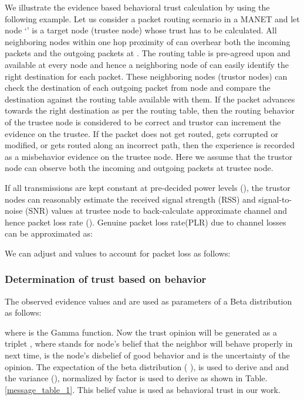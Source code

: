 \documentclass[conference]{IEEEtran}
\begin{document}
We illustrate the evidence based behavioral trust calculation by using the following example.
Let us consider a packet routing scenario in a MANET and let node `' is a target node (trustee node) whose trust has to be calculated. All neighboring nodes within one hop proximity of  can overhear both the incoming packets and the outgoing packets at . The routing table is pre-agreed upon and available at every node and hence a neighboring node of  can easily identify the right destination for each packet. These neighboring nodes (trustor nodes) can check the destination of each outgoing packet from node  and compare the destination against the routing table available with them. If the packet advances towards the right destination as per the routing table, then the routing behavior of the trustee node is considered to be correct and trustor can increment the  evidence on the trustee. If the packet does not get routed, gets corrupted or modified, or gets routed along an incorrect path, then the experience is recorded as a misbehavior  evidence on the trustee node. Here we assume that the trustor node can observe both the incoming and outgoing packets at trustee node.

If all transmissions are kept constant at pre-decided power levels (), the trustor nodes can reasonably estimate the received signal strength (RSS) and signal-to-noise (SNR) values at trustee node to back-calculate approximate channel and hence packet loss rate (). Genuine packet loss rate(PLR) due to channel losses can be approximated as:

We can adjust  and  values to account for packet loss as follows:





\subsubsection*{Determination of trust based on behavior}
The observed evidence values  and  are used as parameters of a Beta distribution as follows:

where  is the Gamma function. Now the trust opinion will be generated as a triplet , where  stands for node's belief that the neighbor will behave properly in next time,  is the node's disbelief of good behavior and  is the uncertainty of the opinion. The expectation of the beta distribution ( ), is used to derive  and  and the variance (), normalized by factor  is used to derive  as shown in Table. \ref{message_table_1}. This belief value  is used as behavioral trust in our work.
\end{document}
